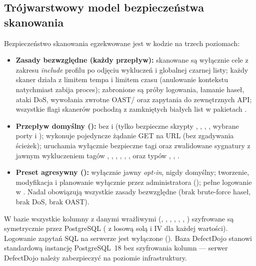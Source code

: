 \documentclass[10pt,a4paper]{article}
\begin{document}
\subsection{Trójwarstwowy model bezpieczeństwa skanowania}

Bezpieczeństwo skanowania egzekwowane jest w kodzie na trzech poziomach:
\begin{itemize}
  \item \textbf{Zasady bezwzględne (każdy przepływ):} skanowane są wyłącznie cele z zakresu \emph{include} profilu po odjęciu wykluczeń i globalnej czarnej listy; każdy skaner działa z limitem tempa i limitem czasu (anulowanie kontekstu natychmiast zabija proces); zabronione są próby logowania, łamanie haseł, ataki DoS, wywołania zwrotne OAST/ oraz zapytania do zewnętrznych API; wszystkie flagi skanerów pochodzą z zamkniętych białych list w pakietach .
  \item \textbf{Przepływ domyślny ():}  bez  i  (tylko bezpieczne skrypty , , , , wybrane porty i );  wykonuje pojedyncze żądanie GET na URL (bez zgadywania ścieżek);  uruchamia wyłącznie bezpieczne tagi oraz zwalidowane sygnatury z jawnym wykluczeniem tagów , , , , , ,  oraz typów , , .
  \item \textbf{Preset agresywny ():} wyłącznie jawny \emph{opt-in}, nigdy domyślny; tworzenie, modyfikacja i planowanie wyłącznie przez administratora (); pełne logowanie w . Nadal obowiązują wszystkie zasady bezwzględne (brak brute-force haseł, brak DoS, brak OAST).
\end{itemize}

\begin{uwaga}
  {\sloppy W bazie  wszystkie kolumny z danymi wrażliwymi (, , , , , , ) szyfrowane są symetrycznie przez PostgreSQL  ( z losową solą i IV dla każdej wartości). Logowanie zapytań SQL na serwerze  jest wyłączone (). Baza DefectDojo stanowi standardową instancję PostgreSQL~18 bez szyfrowania kolumn --- serwer DefectDojo należy zabezpieczyć na poziomie infrastruktury.\par}
\end{uwaga}
\end{document}
